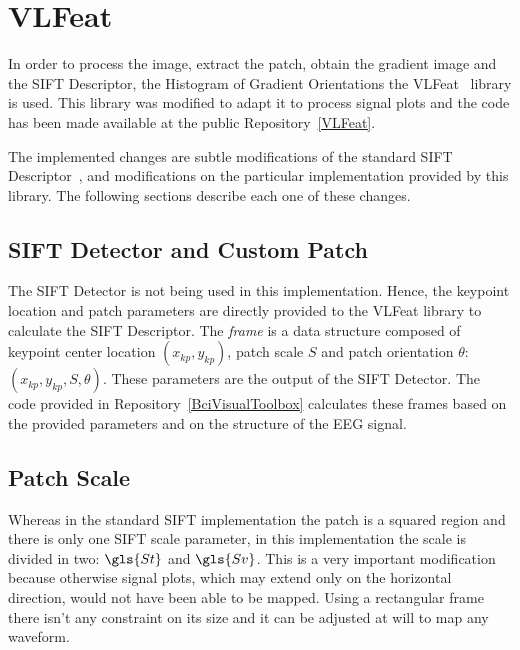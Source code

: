 
\section{VLFeat}

In order to process the image, extract the patch, obtain the gradient image and the SIFT Descriptor, the Histogram of Gradient Orientations the VLFeat~\cite{Vedaldi2010} library is used.   This library was modified to adapt it to process signal plots and the code has been made available at the public Repository~\ref{VLFeat}. 

The implemented changes are subtle modifications of the standard SIFT Descriptor~\cite{Rey-Otero2014}, and modifications on the particular implementation provided by this library.  The following sections describe each one of these changes.

\subsection{SIFT Detector and Custom Patch}

The SIFT Detector is not being used in this implementation.  Hence, the keypoint location and patch parameters are directly provided to the VLFeat library to calculate the SIFT Descriptor.  The \textit{frame} is a data structure composed of keypoint center location  $(x_{kp}, y_{kp})$, patch scale  $S$ and patch orientation $\theta$: $ ( x_{kp}, y_{kp}, S, \theta ) $. These parameters are the output of the SIFT Detector.  The code provided in Repository~\ref{BciVisualToolbox} calculates these frames based on the provided parameters and on the structure of the EEG signal.

\subsection{Patch Scale}

Whereas in the standard SIFT implementation the patch is a squared region and there is only one SIFT scale parameter, in this implementation the scale is divided in two: $\gls{St}$ and $\gls{Sv}$.  This is a very important modification because otherwise signal plots, which may extend only on the horizontal direction, would not have been able to be mapped.  Using a rectangular frame there isn't any constraint on its size and it can be adjusted at will to map any waveform.


